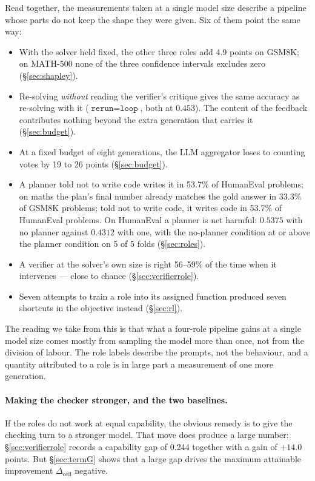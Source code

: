 \documentclass[11pt,a4paper]{article}
\newcommand{\dceil}{\Delta_{\mathrm{ceil}}}
\begin{document}
Read together, the measurements taken at a single model size describe a pipeline whose parts do not keep
the shape they were given. Six of them point the same way:
\begin{itemize}\itemsep2pt
\item With the solver held fixed, the other three roles add 4.9 points on GSM8K; on MATH-500 none of the
      three confidence intervals excludes zero (\S\ref{sec:shapley}).
\item Re-solving \emph{without} reading the verifier's critique gives the same accuracy as re-solving with
      it ($\texttt{rerun} = \texttt{loop}$, both at $0.453$). The content of the feedback contributes
      nothing beyond the extra generation that carries it (\S\ref{sec:budget}).
\item At a fixed budget of eight generations, the LLM aggregator loses to counting votes by 19 to 26
      points (\S\ref{sec:budget}).
\item A planner told not to write code writes it in 53.7\% of HumanEval problems; on maths the plan's final number already matches the gold answer in 33.3\% of GSM8K problems; told not to write
      code, it writes code in 53.7\% of HumanEval problems. On HumanEval a planner is net harmful:
      $0.5375$ with no planner against $0.4312$ with one, with the no-planner condition at or above the
      planner condition on 5 of 5 folds (\S\ref{sec:roles}).
\item A verifier at the solver's own size is right 56--59\% of the time when it intervenes --- close to
      chance (\S\ref{sec:verifierrole}).
\item Seven attempts to train a role into its assigned function produced seven shortcuts in the objective
      instead (\S\ref{sec:rl}).
\end{itemize}
The reading we take from this is that what a four-role pipeline gains at a single model size comes mostly
from sampling the model more than once, not from the division of labour. The role labels describe the
prompts, not the behaviour, and a quantity attributed to a role is in large part a measurement of one
more generation.

\paragraph{Making the checker stronger, and the two baselines.} If the roles do not work at equal
capability, the obvious remedy is to give the checking turn to a stronger model. That move does produce a
large number: \S\ref{sec:verifierrole} records a capability gap of 0.244 together with a gain of $+14.0$ points.
But \S\ref{sec:termG} shows that a large gap drives the maximum attainable improvement $\dceil$ negative.
\end{document}
